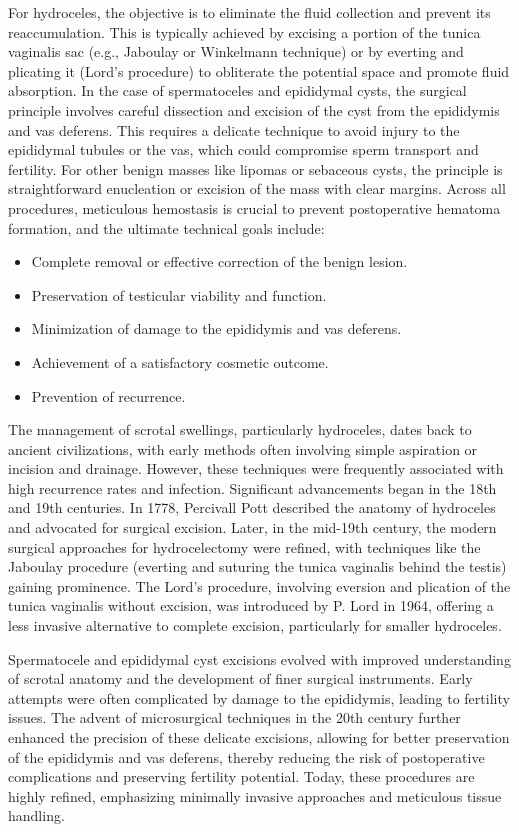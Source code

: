 For hydroceles, the objective is to eliminate the fluid collection and prevent its reaccumulation. This is typically achieved by excising a portion of the tunica vaginalis sac (e.g., Jaboulay or Winkelmann technique) or by everting and plicating it (Lord's procedure) to obliterate the potential space and promote fluid absorption. In the case of spermatoceles and epididymal cysts, the surgical principle involves careful dissection and excision of the cyst from the epididymis and vas deferens. This requires a delicate technique to avoid injury to the epididymal tubules or the vas, which could compromise sperm transport and fertility. For other benign masses like lipomas or sebaceous cysts, the principle is straightforward enucleation or excision of the mass with clear margins. Across all procedures, meticulous hemostasis is crucial to prevent postoperative hematoma formation, and the ultimate technical goals include:
\begin{itemize}
  \item Complete removal or effective correction of the benign lesion.
  \item Preservation of testicular viability and function.
  \item Minimization of damage to the epididymis and vas deferens.
  \item Achievement of a satisfactory cosmetic outcome.
  \item Prevention of recurrence.
\end{itemize}

The management of scrotal swellings, particularly hydroceles, dates back to ancient civilizations, with early methods often involving simple aspiration or incision and drainage. However, these techniques were frequently associated with high recurrence rates and infection. Significant advancements began in the 18th and 19th centuries. In 1778, Percivall Pott described the anatomy of hydroceles and advocated for surgical excision. Later, in the mid-19th century, the modern surgical approaches for hydrocelectomy were refined, with techniques like the Jaboulay procedure (everting and suturing the tunica vaginalis behind the testis) gaining prominence. The Lord's procedure, involving eversion and plication of the tunica vaginalis without excision, was introduced by P. Lord in 1964, offering a less invasive alternative to complete excision, particularly for smaller hydroceles.

Spermatocele and epididymal cyst excisions evolved with improved understanding of scrotal anatomy and the development of finer surgical instruments. Early attempts were often complicated by damage to the epididymis, leading to fertility issues. The advent of microsurgical techniques in the 20th century further enhanced the precision of these delicate excisions, allowing for better preservation of the epididymis and vas deferens, thereby reducing the risk of postoperative complications and preserving fertility potential. Today, these procedures are highly refined, emphasizing minimally invasive approaches and meticulous tissue handling.

